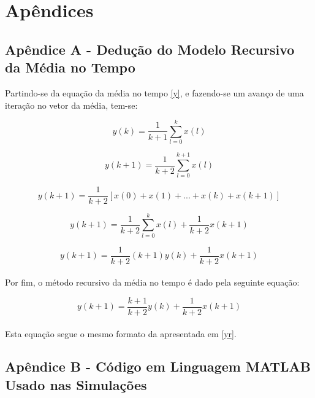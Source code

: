 \chapter*{Apêndices}%


\section*{Apêndice A - Dedução do Modelo Recursivo da Média no Tempo}\label{apendiceA}%

Partindo-se da equação da média no tempo \eqref{y}, e fazendo-se um avanço de uma iteração no vetor da média, tem-se:

\begin{equation}\nonumber
y(k) = \frac{1}{k+1} \sum^{k}_{l=0} x(l)
\end{equation}

\begin{equation}\nonumber
y(k+1) = \frac{1}{k+2} \sum^{k+1}_{l=0} x(l)
\end{equation}

\begin{equation}\nonumber
y(k+1) = \frac{1}{k+2} [x(0) + x(1) + ... + x(k) + x(k+1)]
\end{equation}

\begin{equation}\nonumber
y(k+1) = \frac{1}{k+2} \sum^{k}_{l=0} x(l) + \frac{1}{k+2} x(k+1)
\end{equation}

\begin{equation}\nonumber
y(k+1) = \frac{1}{k+2} (k+1)y(k) + \frac{1}{k+2} x(k+1)
\end{equation}\\

Por fim, o método recursivo da média no tempo é dado pela seguinte equação:

\begin{equation}\nonumber
y(k+1) = \frac{k+1}{k+2} y(k) + \frac{1}{k+2} x(k+1)
\end{equation}\\

Esta equação segue o mesmo formato da apresentada em \eqref{yr}.


\section*{Apêndice B - Código em Linguagem MATLAB Usado nas Simulações}\label{apendiceB}%

